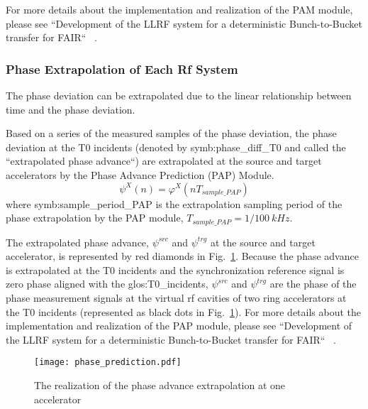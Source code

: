 For more details about the implementation and realization of the PAM module, please see ``Development of the LLRF system for a deterministic Bunch-to-Bucket transfer for FAIR`` ~\cite{ferrand_development_nodate}. 
\subsubsection{Phase Extrapolation of Each Rf System}
The phase deviation can be extrapolated due to the linear relationship between time and the phase deviation. 

Based on a series of the measured samples of the phase deviation, the phase deviation at the T0 incidents (denoted by \gls{symb:phase_diff_T0} and called the ``extrapolated phase advance``) are extrapolated at the source and target accelerators by the Phase Advance Prediction (\gls{PAP}) Module.
\begin{equation}
\psi^\mathit{X}(n)=\varphi^X(nT_\mathit{sample\_PAP})
\end{equation}
where \gls{symb:sample_period_PAP} is the extrapolation sampling period of the phase extrapolation by the PAP module, $T_\mathit{sample\_PAP}=1/\SI{100}{kHz}$.

The extrapolated phase advance, $\psi^\mathit{src}$ and $\psi^\mathit{trg}$ at the source and target accelerator, is represented by red diamonds in Fig.~\ref{phase_prediction1}. Because the phase advance is extrapolated at the T0 incidents and the synchronization reference signal is zero phase aligned with the \gls{glos:T0_incidents}, $\psi^\mathit{src}$ and $\psi^\mathit{trg}$ are the phase of the phase measurement signals at the virtual rf cavities of two ring accelerators at the T0 incidents (represented as black dots in Fig.~\ref{phase_prediction1}). For more details about the implementation and realization of the PAP module, please see ``Development of the LLRF system for a deterministic Bunch-to-Bucket transfer for FAIR`` ~\cite{ferrand_development_nodate}.   
\begin{figure}[!htb]
   \centering   
   \texttt{[image: phase\_prediction.pdf]}
   \caption{The realization of the phase advance extrapolation at one accelerator}
   \label{phase_prediction1}
\end{figure}

